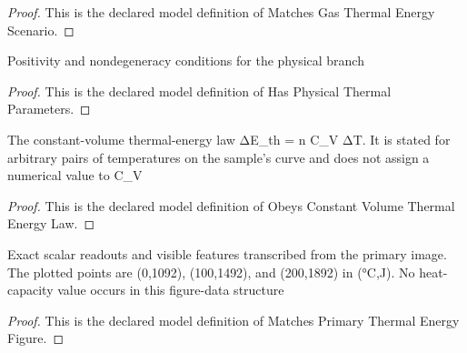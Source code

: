 \begin{proof}
  This is the declared model definition of Matches Gas Thermal Energy Scenario.
\end{proof}
\begin{definition}
  \label{def:physics:phyx-mini-0379:phyxminiproblems-problemphyxmini0379-hasphysicalthermalparameters}
  Positivity and nondegeneracy conditions for the physical branch
\end{definition}
\begin{proof}
  This is the declared model definition of Has Physical Thermal Parameters.
\end{proof}
\begin{definition}
  \label{def:physics:phyx-mini-0379:phyxminiproblems-problemphyxmini0379-obeysconstantvolumethermalenergylaw}
  The constant-volume thermal-energy law ΔE\_th = n C\_V ΔT. It is stated for arbitrary pairs of temperatures on the sample's curve and does not assign a numerical value to C\_V
\end{definition}
\begin{proof}
  This is the declared model definition of Obeys Constant Volume Thermal Energy Law.
\end{proof}
\begin{definition}
  \label{def:physics:phyx-mini-0379:phyxminiproblems-problemphyxmini0379-matchesprimarythermalenergyfigure}
  Exact scalar readouts and visible features transcribed from the primary image. The plotted points are (0,1092), (100,1492), and (200,1892) in (°C,J). No heat-capacity value occurs in this figure-data structure
\end{definition}
\begin{proof}
  This is the declared model definition of Matches Primary Thermal Energy Figure.
\end{proof}

